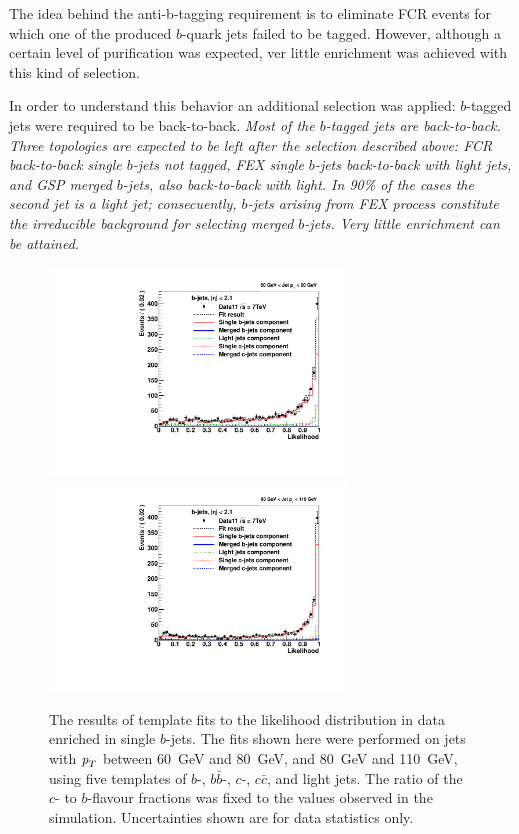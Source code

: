 The idea behind the anti-b-tagging requirement is to eliminate FCR events for which one of the produced $b$-quark jets failed to be tagged. However, although a certain level of purification was expected, ver little enrichment was achieved with this kind of selection. 

In order to understand this behavior an additional selection was applied: $b$-tagged jets were required to be back-to-back.   %
\emph{Most of the $b$-tagged jets are back-to-back. Three topologies are expected to be left after the selection described above: FCR back-to-back single $b$-jets not tagged,  FEX single $b$-jets back-to-back with light jets, and GSP merged $b$-jets, also back-to-back with light.  In 90\% of the cases the second jet is a light jet; consecuently, $b$-jets arising from FEX process constitute the irreducible background for selecting merged $b$-jets. Very little enrichment can be attained.}

 
 







\begin{figure}[tp]
\centering
\includegraphics[width=0.7\textwidth]{FIGS/Fits/LikelihoodFit_3param_ETAFull_DataEnriched2btag_Bin1.pdf}
\includegraphics[width=0.7\textwidth]{FIGS/Fits/LikelihoodFit_3param_ETAFull_DataEnriched2btag_Bin2.pdf}
\caption{The results of template fits to the likelihood distribution in data enriched in single $b$-jets. The fits shown here were performed on jets with ${\emph{p}_{T}}$ between  60~GeV and 80~GeV, and 80~GeV and 110~GeV, using five templates of $b$-, $b\bar{b}$-, $c$-, $c\bar{c}$, and light jets.  The ratio of the $c$- to $b$-flavour fractions was fixed to the values observed in the simulation.  Uncertainties shown are for data statistics only.}
\label{fig:fitenriched2btag1}
\end{figure}



